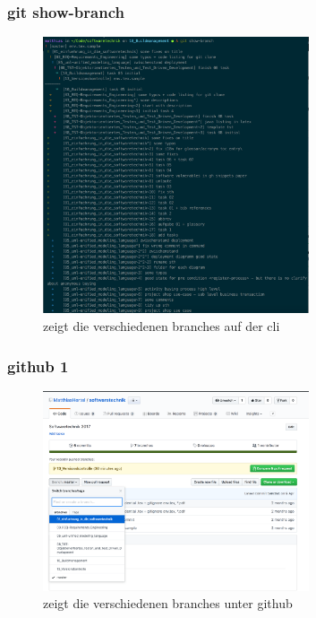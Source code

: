 \documentclass[12pt]{article}
\begin{document}
\subsubsection{git show-branch}
\begin{figure}[H]
  \centering
  \includegraphics[width=0.7\textwidth]{./img/git_show-branch.png}
  \captionsetup{name=Abb.,font=footnotesize}
  \caption{zeigt die verschiedenen branches auf der cli}
\end{figure}

\subsubsection{github 1}
\begin{figure}[H]
  \centering
  \includegraphics[width=0.7\textwidth]{./img/github_branching.png}
  \captionsetup{name=Abb.,font=footnotesize}
  \caption{zeigt die verschiedenen branches unter github}
\end{figure}
\end{document}
